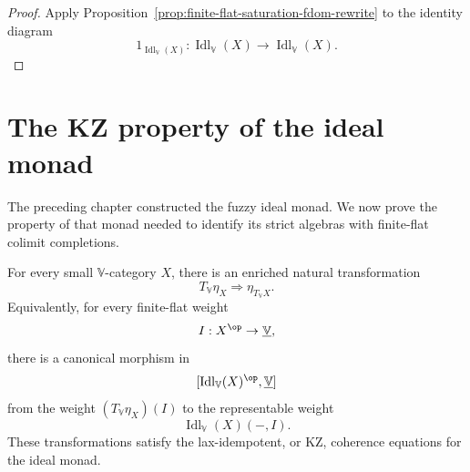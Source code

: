 \begin{proof}
Apply Proposition~\ref{prop:finite-flat-saturation-fdom-rewrite} to the identity
diagram
\[
    1_{\operatorname{Idl}_{\mathbb V}(X)}:
    \operatorname{Idl}_{\mathbb V}(X)
    \to
    \operatorname{Idl}_{\mathbb V}(X).
\]
\end{proof}

\section{The KZ property of the ideal monad}
\label{sec:kz-property-ideal-monad-fdom-rewrite}

The preceding chapter constructed the fuzzy ideal monad.  We now prove the
property of that monad needed to identify its strict algebras with finite-flat
colimit completions.

\begin{proposition}
\label{prop:ideal-monad-kz-fdom-rewrite}
For every small \(\mathbb V\)-category \(X\), there is an enriched natural
transformation
\[
    T_{\mathbb V}\eta_X
    \Longrightarrow
    \eta_{T_{\mathbb V}X}.
\]
Equivalently, for every finite-flat weight
\[
    I:X^{\op}\to\underline{\mathbb V},
\]
there is a canonical morphism in
\[
    [\operatorname{Idl}_{\mathbb V}(X)^{\op},\underline{\mathbb V}]
\]
from the weight \((T_{\mathbb V}\eta_X)(I)\) to the representable weight
\[
    \operatorname{Idl}_{\mathbb V}(X)(-,I).
\]
These transformations satisfy the lax-idempotent, or KZ, coherence equations for
the ideal monad.
\end{proposition}

